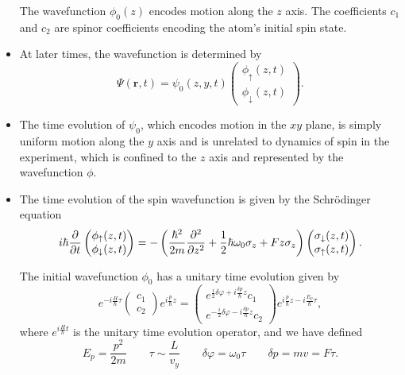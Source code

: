 \documentclass[11pt, a4paper]{article}
\newcommand{\Schro}{Schr\"{o}dinger\xspace}
\renewcommand{\vec}[1]{\bm{#1}}  %
\newcommand{\ua}{\uparrow}  %
\newcommand{\da}{\downarrow}  %
\renewcommand{\r}{\vec{r}}  %
\begin{document}
\begin{itemize}
    The wavefunction $ \phi_{0}(z) $ encodes motion along the $ z $ axis. The coefficients $ c_{1} $ and $ c_{2} $ are spinor coefficients encoding the atom's initial spin state.

    \item At later times, the wavefunction is determined by
    \begin{equation*}
        \Psi(\r, t) = \psi_{0}(z, y, t)
        \begin{pmatrix}
            \phi_{\ua}(z, t)\\
            \phi_{\da}(z, t)
        \end{pmatrix}.
    \end{equation*}
    
    \item The time evolution of $ \psi_{0} $, which encodes motion in the $ xy $ plane, is simply uniform motion along the $ y $ axis and is unrelated to dynamics of spin in the experiment, which is confined to the $ z $ axis and represented by the wavefunction $ \phi $.

    \item The time evolution of the spin wavefunction is given by the \Schro equation
    \begin{equation*}
        i \hbar \pdv{t} 
        \begin{pmatrix}
            \phi_{\ua}(z, t)\\
            \phi_{\da}(z, t)
        \end{pmatrix}
        = - 
        \left( \frac{\hbar^{2}}{2m}\pdv[2]{}{z} + \frac{1}{2}\hbar\omega_{0} \sigma_{z} + F z \sigma_{z} \right)
        \begin{pmatrix}
            \sigma_{\da}(z, t)\\
            \sigma_{\ua}(z, t)
        \end{pmatrix}.
    \end{equation*}

    The initial wavefunction $ \phi_{0} $ has a unitary time evolution given by
    \begin{equation*}
        e^{-i \frac{H}{\hbar}\tau}
        \begin{pmatrix}
            c_{1}\\
            c_{2}
        \end{pmatrix}
        e^{i \frac{p}{\hbar}z}
        = 
        \begin{pmatrix}
            e^{\frac{i}{2}\delta\varphi + i \frac{\delta p}{\hbar}z}c_{1}\\
            e^{-\frac{i}{2}\delta\varphi - i \frac{\delta p}{\hbar}z}c_{2}
        \end{pmatrix}
        e^{i \frac{p}{\hbar}z - i \frac{E_{p}}{\hbar}\tau},
    \end{equation*}
    where $ e^{i \frac{H}{\hbar}t} $ is the unitary time evolution operator, and we have defined
    \begin{equation*}
        E_{p} = \frac{p^{2}}{2m} \qquad \tau \sim \frac{L}{v_{y}} \qquad \delta \varphi = \omega_{0} \tau \qquad \delta p = m v = F \tau.
    \end{equation*}


\end{itemize}
\end{document}
